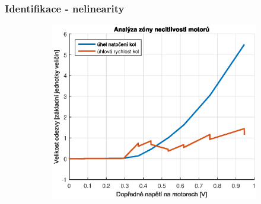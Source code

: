 \documentclass{beamer}
\begin{document}
    \begin{frame}
        \frametitle{Identifikace - nelinearity}


        \begin{figure}
            \begin{subfigure}{0.45\textwidth}
                \centerline{\includegraphics[width=\linewidth]{deadzone_motory_vpred.eps}}
            \end{subfigure}
            \begin{subfigure}{0.45\textwidth}

\end{subfigure}
\end{figure}
\end{frame}
\end{document}
